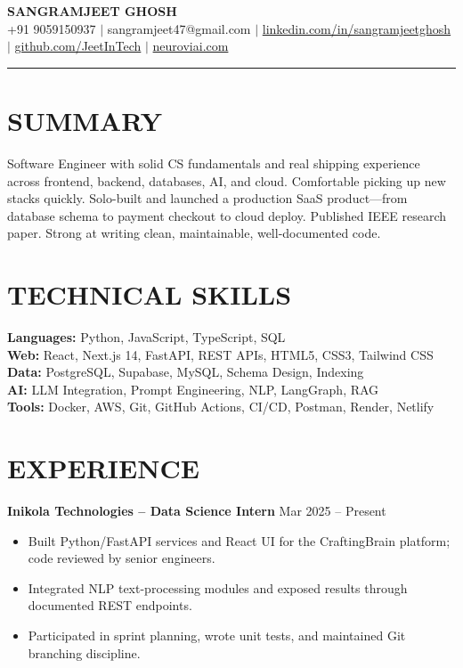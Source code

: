 \documentclass[10pt]{article}
\begin{document}
\begin{center}
{\Large \textbf{SANGRAMJEET GHOSH}} \\[2pt]
{\small +91 9059150937 $|$ sangramjeet47@gmail.com $|$
\href{https://www.linkedin.com/in/sangramjeetghosh}{linkedin.com/in/sangramjeetghosh} $|$
\href{https://github.com/JeetInTech}{github.com/JeetInTech} $|$
\href{https://neuroviai.com}{neuroviai.com}}
\end{center}

\noindent\rule{\textwidth}{0.4pt}

\section*{SUMMARY}
Software Engineer with solid CS fundamentals and real shipping experience across frontend, backend, databases, AI, and cloud. Comfortable picking up new stacks quickly. Solo-built and launched a production SaaS product---from database schema to payment checkout to cloud deploy. Published IEEE research paper. Strong at writing clean, maintainable, well-documented code.

\section*{TECHNICAL SKILLS}
\textbf{Languages:} Python, JavaScript, TypeScript, SQL \\
\textbf{Web:} React, Next.js 14, FastAPI, REST APIs, HTML5, CSS3, Tailwind CSS \\
\textbf{Data:} PostgreSQL, Supabase, MySQL, Schema Design, Indexing \\
\textbf{AI:} LLM Integration, Prompt Engineering, NLP, LangGraph, RAG \\
\textbf{Tools:} Docker, AWS, Git, GitHub Actions, CI/CD, Postman, Render, Netlify

\section*{EXPERIENCE}
\textbf{Inikola Technologies -- Data Science Intern} \hfill Mar 2025 -- Present
\begin{itemize}
\item Built Python/FastAPI services and React UI for the CraftingBrain platform; code reviewed by senior engineers.
\item Integrated NLP text-processing modules and exposed results through documented REST endpoints.
\item Participated in sprint planning, wrote unit tests, and maintained Git branching discipline.
\end{itemize}
\end{document}
